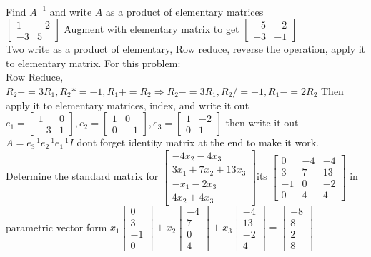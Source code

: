 \documentclass{article}
\begin{document}
\begin{multicols*}{2}
\\Find $A^{-1}$ and write $A$ as a product of elementary matrices \\$\begin{bmatrix}1&-2\\-3&5\end{bmatrix}$ Augment with elementary matrix to get $\begin{bmatrix}-5&-2\\-3&-1\end{bmatrix}$
\\Two write as a product of elementary, Row reduce, reverse the operation, apply it to elementary matrix. For this problem: 
\\Row Reduce, $R_2 += 3R_1, R_2*=-1, R_1+=R_2 \Rightarrow R_2-=3R_1, R_2/=-1, R_1-=2R_2$ Then apply it to elementary matrices, index, and write it out
$e_1=\begin{bmatrix}1&0\\-3&1\end{bmatrix},e_2=\begin{bmatrix}1&0\\0&-1\end{bmatrix},e_3=\begin{bmatrix}1&-2\\0&1\end{bmatrix}$ then write it out $A=e_3^{-1}e_2^{-1}e_1^{-1}I$ dont forget identity matrix at the end to make it work.
\\Determine the standard matrix for $\begin{bmatrix}-4x_2-4x_3\\3x_1+7x_2+13x_3\\-x_1-2x_3\\4x_2+4x_3\end{bmatrix}$its $\begin{bmatrix}0&-4&-4\\3&7&13\\-1&0&-2\\0&4&4\end{bmatrix}$ in parametric vector form $x_1\begin{bmatrix}0\\3\\-1\\0\end{bmatrix}+x_2\begin{bmatrix}-4\\7\\0\\4\end{bmatrix}+x_3\begin{bmatrix}-4\\13\\-2\\4\end{bmatrix}=\begin{bmatrix}-8\\8\\2\\8\end{bmatrix}$\\


\end{multicols*}
\end{document}
